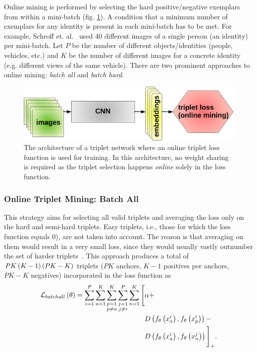 Online mining is performed by selecting the hard positive/negative exemplars from within a mini-batch (fig. \ref{fig:TripletArchitectureOnlineMining}). A condition that a minimum number of exemplars for any identity is present in each mini-batch has to be met. For example, Schroff et. al.~\cite{schroff2015facenet} used $40$ different images of a single person (an identity) per mini-batch. Let $P$ be the number of different objects/identities (people, vehicles, etc.) and $K$ be the number of different images for a concrete identity (e.g. different views of the same vehicle). There are two prominent approaches to online mining: \emph{batch all} and \emph{batch hard}.

\begin{figure}[t]
    \centerline{\includegraphics[width=0.55\linewidth]{figures/theoretical_foundations/triplet_architecture_online_mining.pdf}}
    \caption[Triplet loss online mining architecture]{The architecture of a triplet network where an online triplet loss function is used for training. In this architecture, no weight sharing is required as the triplet selection happens \emph{online} solely in the loss function.}
    \label{fig:TripletArchitectureOnlineMining}
\end{figure}

\subsubsection{Online Triplet Mining: Batch All}

This strategy aims for selecting all valid triplets and averaging the loss only on the hard and semi-hard triplets. Easy triplets, i.e., those for which the loss function equals $0$), are not taken into account. The reason is that averaging on them would result in a very small loss, since they would usually vastly outnumber the set of harder triplets~\cite{hermans2017triplet}. This approach produces a total of $PK \left( {K - 1} \right) \left( {PK - K} \right)$ triplets ($PK$ anchors, $K - 1$ positives per anchors, $PK - K$ negatives) incorporated in the loss function as
\begin{equation}
    \label{eq:BatchAllLossFunction}
    \begin{aligned}
        {\mathcal{L}_{batchall}} \left( \theta \right) =
        \sum_{i = 1}^P
        \sum_{a = 1}^K
        \sum_{\substack{p = 1\\p \neq a}}^K
        \sum_{\substack{j = 1\\j \neq i}}^P
        \sum_{n = 1}^K
        \Bigg[
        &\alpha +\\
        &{D} \left( 
            {f_\theta} \left( x_a^i \right),
            {f_\theta} \left( x_p^i \right)
         \right) -\\
        &{D} \left( 
            {f_\theta} \left( x_a^i \right),
            {f_\theta} \left( x_n^j \right)
         \right)
        {\Bigg]}_{+}.
    \end{aligned}
\end{equation}

